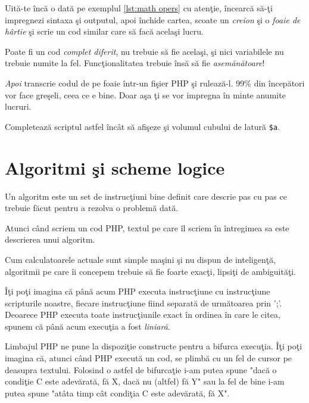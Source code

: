 \begin{Exercise}[difficulty=1,title={Primul pas spre creativitate}]
\ExePart
Uită-te încă o dată pe exemplul \ref{lst:math opers} cu atenţie,
încearcă să-ţi impregnezi sintaxa şi outputul, apoi închide
cartea, scoate un \textit{creion} şi o \textit{foaie de hârtie}
şi scrie un cod similar care să facă acelaşi lucru.

Poate fi un cod \textit{complet diferit}, nu trebuie să fie acelaşi,
şi nici variabilele nu trebuie numite la fel. Funcţionalitatea
trebuie însă să fie \textit{asemănătoare}!

\textit{Apoi} transcrie codul de pe foaie într-un fişier
PHP şi rulează-l. 99\% din începători vor face greşeli,
ceea ce e bine. Doar aşa ţi se vor impregna în minte anumite lucruri.

\ExePart
Completează scriptul astfel încât să afişeze şi volumul cubului
de latură \texttt{\$a}.
\end{Exercise}



\section{Algoritmi şi scheme logice}
Un algoritm este un set de instrucţiuni bine definit
care descrie pas cu pas ce trebuie făcut pentru
a rezolva o problemă dată.

Atunci când scriem un cod PHP, textul pe care
îl scriem în întregimea sa este descrierea unui algoritm.

Cum calculatoarele actuale sunt simple maşini şi nu
dispun de inteligenţă, algoritmii pe care îi concepem
trebuie să fie foarte exacţi, lipsiţi de ambiguităţi.

Îţi poţi imagina că până acum PHP executa instrucţiune
cu instrucţiune scripturile noastre, fiecare instrucţiune
fiind separată de următoarea prin ';'.
Deoarece PHP executa toate instrucţiunile exact în ordinea
în care le citea, spunem că până acum execuţia a fost
\textit{liniară}.

Limbajul PHP ne pune la dispoziţie constructe pentru a bifurca
execuţia. Îţi poţi imagina că, atunci când PHP
execută un cod, se plimbă cu un fel de cursor
pe deasupra {\glqq}textului{\grqq}. Folosind o astfel de bifurcaţie
i-am putea spune "dacă o condiţie C este adevărată, fă
X, dacă nu (altfel) fă Y" sau la fel de bine
i-am putea spune "atâta timp cât condiţia C
este adevărată, fă X".

